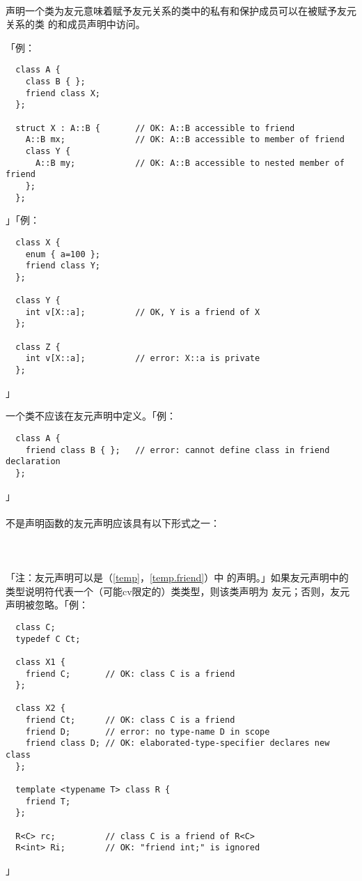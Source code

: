 \paragraph{}
声明一个类为友元意味着赋予友元关系的类中的私有和保护成员可以在被赋予友元关系的类
的和成员声明中访问。

「例：
\begin{lstlisting}
  class A {
    class B { };
    friend class X;
  };

  struct X : A::B {       // OK: A::B accessible to friend
    A::B mx;              // OK: A::B accessible to member of friend
    class Y {
      A::B my;            // OK: A::B accessible to nested member of friend
    };
  };
\end{lstlisting}」「例：
\begin{lstlisting}
  class X {
    enum { a=100 };
    friend class Y;
  };

  class Y {
    int v[X::a];          // OK, Y is a friend of X
  };

  class Z {
    int v[X::a];          // error: X::a is private
  };
\end{lstlisting}」

一个类不应该在友元声明中定义。「例：
\begin{lstlisting}
  class A {
    friend class B { };   // error: cannot define class in friend declaration
  };
\end{lstlisting}」

\paragraph{}
不是声明函数的友元声明应该具有以下形式之一：                                  \\
\mbox{}                     \\
\mbox{}\\
\mbox{} \\
「注：友元声明可以是（\ref{temp}，\ref{temp.friend}）中
的声明。」如果友元声明中的类型说明符代表一个（可能cv限定的）类类型，则该类声明为
友元；否则，友元声明被忽略。「例：
\begin{lstlisting}
  class C;
  typedef C Ct;

  class X1 {
    friend C;       // OK: class C is a friend
  };

  class X2 {
    friend Ct;      // OK: class C is a friend
    friend D;       // error: no type-name D in scope
    friend class D; // OK: elaborated-type-specifier declares new class
  };

  template <typename T> class R {
    friend T;
  };

  R<C> rc;          // class C is a friend of R<C>
  R<int> Ri;        // OK: "friend int;" is ignored
\end{lstlisting}」


